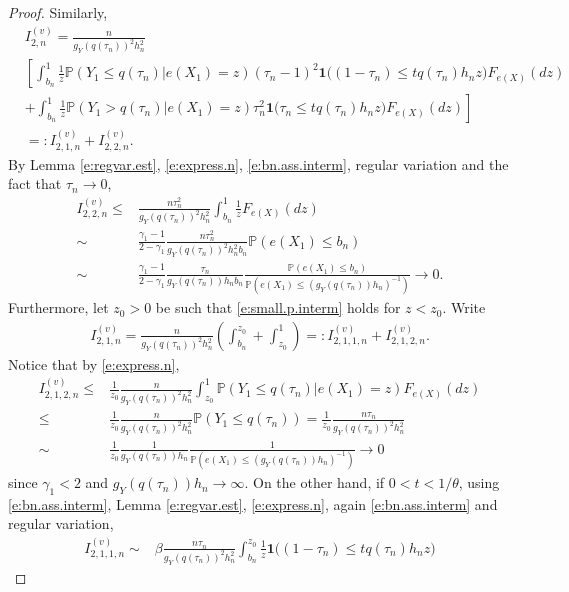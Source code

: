 \documentclass[12pt]{amsart}
\newcommand{\LFe}{F_{e(X)}}
\newcommand{\1}{\mathbbm{1}}
\newcommand{\0}{\mathbf{0}}
\newcommand{\one}{\mathbf{1}}
\theoremstyle{plain}
\theoremstyle{definition}
\newcommand{\bbP}{\mathbb{P}}
\begin{document}
\begin{proof}
Similarly, 
 \begin{align*}
&I_{2,n}^{(v)}= \frac{n}{g_Y(q(\tau_n))^2h_n^2} \\
&\left[ \int_{b_n}^1 \frac1z\bbP(Y_1\leq q(\tau_n)|e(X_1)=z) (\tau_n-1)^2
   \one\bigl( (1-\tau_n )\leq t q(\tau_n)h_nz\bigr)
\LFe(dz) \right.\\
& \left.+ \int_{b_n}^1 \frac1z\bbP(Y_1> q(\tau_n)|e(X_1)=z) \tau_n^2
   \one\bigl( \tau_n\leq t q(\tau_n)h_nz\bigr)
\LFe(dz) \right] \\
&=: I_{2,1,n}^{(v)}+I_{2,2,n}^{(v)}. 
 \end{align*}
By Lemma \ref{e:regvar.est},   \eqref{e:express.n}, \eqref{e:bn.ass.interm}, regular variation and the fact that $\tau_n\to 0$, 
\begin{align*}
  I_{2,2,n}^{(v)} \leq& \frac{n\tau_n^2}{g_Y(q(\tau_n))^2h_n^2}
  \int_{b_n}^1 \frac1z \LFe(dz) \\
\sim& \frac{\gamma_1-1}{2-\gamma_1}
  \frac{n\tau_n^2}{g_Y(q(\tau_n))^2h_n^2b_n} \bbP(e(X_1)\leq b_n)\\
\sim& \frac{\gamma_1-1}{2-\gamma_1}
  \frac{\tau_n}{g_Y(q(\tau_n))h_nb_n} \frac{\bbP(e(X_1)\leq
      b_n)}{\bbP(e(X_1)\leq (g_Y(q(\tau_n))h_n)^{-1})} \to 0.
\end{align*}
Furthermore, let $z_0>0$ be such that \eqref{e:small.p.interm} holds
for $z<z_0$. Write 
\begin{align*}
  I_{2,1,n}^{(v)} = \frac{n}{g_Y(q(\tau_n))^2h_n^2}\left( \int_{b_n}^{z_0} +
\int_{z_0}^1 \right) =: I_{2,1,1,n}^{(v)}+ 
  I_{2,1,2,n}^{(v)}. 
\end{align*}
Notice that by \eqref{e:express.n}, 
\begin{align*}
I_{2,1,2,n}^{(v)} \leq& \frac{1}{z_0} \frac{n}{g_Y(q(\tau_n))^2h_n^2}
\int_{z_0}^1 \bbP(Y_1\leq q(\tau_n)|e(X_1)=z) \LFe(dz) \\
\leq& \frac{1}{z_0} \frac{n}{g_Y(q(\tau_n))^2h_n^2} \bbP(Y_1\leq q(\tau_n))
= \frac{1}{z_0} \frac{n\tau_n}{g_Y(q(\tau_n))^2h_n^2} \\
\sim& \frac{1}{z_0} \frac{1}{g_Y(q(\tau_n))h_n}\frac{ 1}{\bbP(e(X_1)\leq
      (g_Y(q(\tau_n))h_n)^{-1})}  \to 0
\end{align*}
since $\gamma_1<2$ and $g_Y(q(\tau_n))h_n\to\infty$. On the other
hand, if $0<t<1/\theta$, using \eqref{e:bn.ass.interm}, Lemma \ref{e:regvar.est}, 
\eqref{e:express.n}, again \eqref{e:bn.ass.interm} and regular variation, 
\begin{align*}
  I_{2,1,1,n}^{(v)} \sim&\beta \frac{n\tau_n}{g_Y(q(\tau_n))^2h_n^2} 
\int_{b_n}^{z_0} \frac1z  \one\bigl( (1-\tau_n )\leq t q(\tau_n)h_nz\bigr)

\end{align*}
\end{proof}
\end{document}
